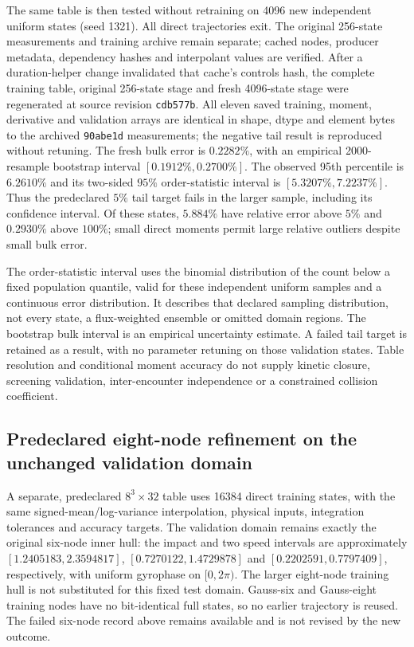 \documentclass[11pt,letterpaper]{article}
\begin{document}
The same table is then tested without retraining on 4096 new independent
uniform states (seed 1321). All direct trajectories exit. The original
256-state measurements and training archive remain separate; cached nodes,
producer metadata, dependency hashes and interpolant values are verified.
After a duration-helper change invalidated that cache's controls hash, the
complete training table, original 256-state stage and fresh 4096-state stage
were regenerated at source revision \texttt{cdb577b}. All eleven saved
training, moment, derivative and validation arrays are identical in shape,
dtype and element bytes to the archived \texttt{90abe1d} measurements;
the negative tail result is reproduced without retuning.
The fresh bulk error is $0.2282\%$, with an empirical 2000-resample
bootstrap interval $[0.1912\%,0.2700\%]$. The observed 95th percentile is
$6.2610\%$ and its two-sided $95\%$ order-statistic interval is
$[5.3207\%,7.2237\%]$. Thus the predeclared $5\%$ tail target fails in
the larger sample, including its confidence interval. Of these states,
$5.884\%$ have relative error above $5\%$ and $0.2930\%$ above $100\%$;
small direct moments permit large relative outliers despite small bulk error.

The order-statistic interval uses the binomial distribution of the count
below a fixed population quantile, valid for these independent uniform
samples and a continuous error distribution. It describes that declared
sampling distribution, not every state, a flux-weighted ensemble or omitted
domain regions. The bootstrap bulk interval is an empirical uncertainty
estimate. A failed tail target is retained as a result, with no parameter
retuning on those validation states. Table resolution and conditional moment
accuracy do not supply kinetic closure, screening validation, inter-encounter
independence or a constrained collision coefficient.

\subsection*{Predeclared eight-node refinement on the unchanged validation domain}
A separate, predeclared $8^3\times32$ table uses 16384 direct training
states, with the same signed-mean/log-variance interpolation, physical inputs,
integration tolerances and accuracy targets. The validation domain remains
exactly the original six-node inner hull: the impact and two speed intervals
are approximately $[1.2405183,2.3594817]$, $[0.7270122,1.4729878]$ and
$[0.2202591,0.7797409]$, respectively, with uniform gyrophase on $[0,2\pi)$.
The larger eight-node training hull is not substituted for this fixed test
domain. Gauss-six and Gauss-eight training nodes have no bit-identical full
states, so no earlier trajectory is reused. The failed six-node record above
remains available and is not revised by the new outcome.
\end{document}
